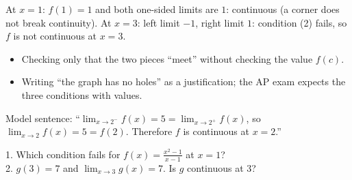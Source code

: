 \begin{example}
\begin{center}
\end{center}
\sol At $x=1$: $f(1)=1$ and both one-sided limits are $1$: continuous (a corner does not break continuity). At $x=3$: left limit $-1$, right limit $1$: condition (2) fails, so $f$ is not continuous at $x=3$.
\end{example}

\begin{mistakes}
\begin{itemize}
\item Checking only that the two pieces ``meet'' without checking the value $f(c)$.
\item Writing ``the graph has no holes'' as a justification; the AP exam expects the three conditions with values.
\end{itemize}
\end{mistakes}

\begin{aptip}
Model sentence: ``$\lim_{x\to2^-}f(x)=5=\lim_{x\to2^+}f(x)$, so $\lim_{x\to2}f(x)=5=f(2)$. Therefore $f$ is continuous at $x=2$.''
\end{aptip}

\begin{quickcheck}
1. Which condition fails for $f(x)=\frac{x^2-1}{x-1}$ at $x=1$?\\
2. $g(3)=7$ and $\lim_{x\to3}g(x)=7$. Is $g$ continuous at $3$?
\end{quickcheck}


